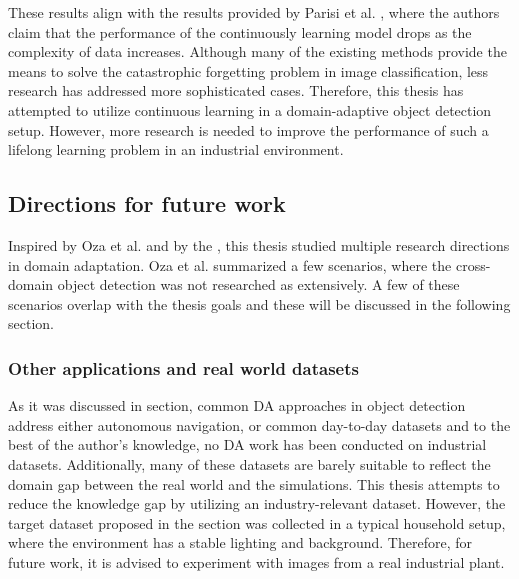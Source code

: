 These results align with the results provided by Parisi et al. \cite{Parisi2018}, where the authors claim that the performance of the continuously learning model drops as the complexity of data increases. Although many of the existing methods provide the means to solve the catastrophic forgetting problem in image classification, less research has addressed more sophisticated cases. Therefore, this thesis has attempted to utilize continuous learning in a domain-adaptive object detection setup. However, more research is needed to improve the performance of such a lifelong learning problem in an industrial environment. 
\FloatBarrier 


\subsection{Directions for future work}
Inspired by Oza et al. \cite{Oza2021} and by the , this thesis studied multiple research directions in domain adaptation. Oza et al. summarized a few scenarios, where the cross-domain object detection was not researched as extensively. A few of these scenarios overlap with the thesis goals and these will be discussed in the following section. 

\subsubsection{Other applications and real world datasets}
As it was discussed in  section, common DA approaches in object detection address either autonomous navigation, or common day-to-day datasets and to the best of the author's knowledge, no DA work has been conducted on  industrial datasets. Additionally, many of these datasets are barely suitable to reflect the domain gap between the real world and the simulations. This thesis attempts to reduce the knowledge gap by utilizing an industry-relevant dataset. However, the target dataset proposed in the  section was collected in a typical household setup, where the environment has a stable lighting and background. Therefore, for future work, it is advised to experiment with images from a real industrial plant.  

